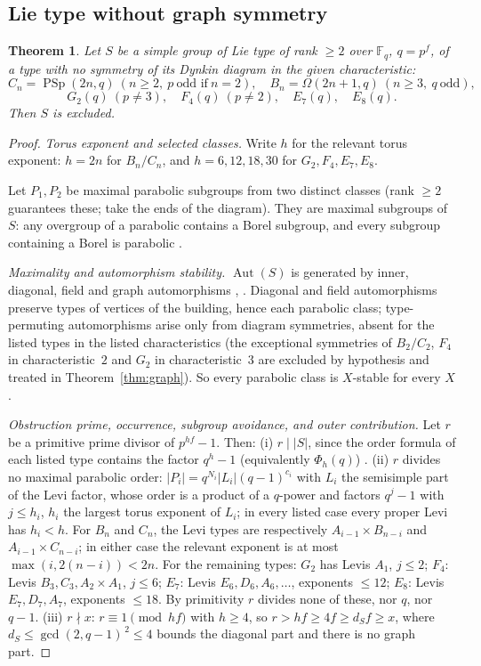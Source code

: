 \documentclass[11pt]{amsart}
\newtheorem{theorem}{Theorem}[section]
\theoremstyle{definition}
\theoremstyle{remark}
\DeclareMathOperator{\Aut}{Aut}
\DeclareMathOperator{\PSp}{PSp}
\newcommand{\F}{\mathbb{F}}
\begin{document}
\subsection{Lie type without graph symmetry}\label{app:nograph}

\begin{theorem}\label{thm:nograph}
Let $S$ be a simple group of Lie type of rank $\geq2$ over $\F_q$,
$q=p^f$, of a type with no symmetry of its Dynkin diagram in the given
characteristic:
\[
C_n=\PSp(2n,q)\ (n\geq2,\ p\ \text{odd if}\ n=2),\quad
B_n=\Omega(2n{+}1,q)\ (n\geq3,\ q\ \text{odd}),
\]
\[
G_2(q)\ (p\neq3),\quad F_4(q)\ (p\neq2),\quad E_7(q),\quad E_8(q).
\]
Then $S$ is excluded.
\end{theorem}

\begin{proof}
\emph{Torus exponent and selected classes.}
Write $h$ for the relevant torus exponent: $h=2n$ for $B_n/C_n$, and
$h=6,12,18,30$ for $G_2,F_4,E_7,E_8$.

Let $P_1,P_2$ be maximal parabolic subgroups from two distinct classes
(rank $\geq2$ guarantees these; take the ends of the diagram). They are
maximal subgroups of $S$: any overgroup of a parabolic contains a Borel
subgroup, and every subgroup containing a Borel is parabolic
\cite[Thm.~8.3.2, p.~112]{Carter}.

\emph{Maximality and automorphism stability.} $\Aut(S)$ is generated by inner, diagonal, field and
graph automorphisms \cite{Steinberg},
\cite[Def.~3.1 and Thm.~3.4, pp.~31--32]{BrotoMollerOliver2019}. Diagonal
and field automorphisms preserve types of vertices of the building,
hence each parabolic class; type-permuting automorphisms arise only from
diagram symmetries, absent for the listed types in the listed
characteristics (the exceptional symmetries of $B_2/C_2$, $F_4$ in
characteristic~$2$ and $G_2$ in characteristic~$3$ are excluded by
hypothesis and treated in Theorem~\ref{thm:graph}). So every parabolic
class is $X$-stable for every $X$.

\emph{Obstruction prime, occurrence, subgroup avoidance, and outer
contribution.} Let $r$ be a primitive prime divisor of
$p^{hf}-1$. Then:
(i) $r\mid|S|$, since the order formula of each listed type contains the
factor $q^h-1$ (equivalently $\Phi_h(q)$)
\cite[Table~6, p.~xvi]{ATLAS}.
(ii) $r$ divides no maximal parabolic order: $|P_i|=q^{N_i}|L_i|
(q-1)^{c_i}$ with $L_i$ the semisimple part of the Levi factor, whose
order is a product of a $q$-power and factors $q^j-1$ with $j\leq h_i$,
$h_i$ the largest torus exponent of $L_i$; in every listed case every
proper Levi has $h_i<h$. For $B_n$ and $C_n$, the Levi types are respectively
$A_{i-1}\times B_{n-i}$ and $A_{i-1}\times C_{n-i}$; in either case the
relevant exponent is at most $\max(i,2(n-i))<2n$. For the remaining types:
$G_2$ has Levis
$A_1$, $j\leq2$; $F_4$: Levis $B_3,C_3,A_2{\times}A_1$, $j\leq6$; $E_7$:
Levis $E_6,D_6,A_6,\dots$, exponents $\leq12$; $E_8$: Levis
$E_7,D_7,A_7$, exponents $\leq18$. By primitivity $r$ divides none of
these, nor $q$, nor $q-1$.
(iii) $r\nmid x$: $r\equiv1\pmod{hf}$ with $h\geq4$, so
$r>hf\geq4f\geq d_S f\geq x$, where $d_S\leq\gcd(2,q-1)^{\,2}\leq4$
bounds the diagonal part and there is no graph part.


\end{proof}
\end{document}
